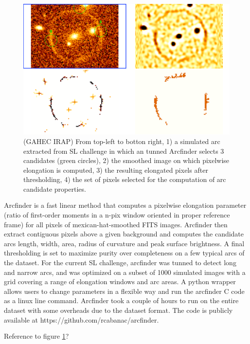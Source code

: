 \documentclass[useAMS,usenatbib]{mn2e}
\newcommand{\red}[1]{{\color{red} #1}}
\begin{document}
\begin{figure}
 \includegraphics[width=\columnwidth]{Cabanac/arcmethod.pdf}
 \caption{ (GAHEC IRAP) From top-left to botton right, 1) a simulated arc extracted from SL challenge in which an tunned Arcfinder selects 3 candidates (green circles), 2) the smoothed image on which pixelwise elongation is computed, 3) the resulting elongated pixels after thresholding, 4) the set of pixels selected for the computation of arc candidate properties. }
 \label{fig:Cabanac}
\end{figure}

Arcfinder \citep{2006astro.ph..6757A,2007A&A...461..813C,2012ApJ...749...38M} is a fast linear method that computes a pixelwise elongation parameter (ratio of first-order moments in a n-pix window oriented in proper reference frame) for all pixels of mexican-hat-smoothed FITS images. Arcfinder then extract contiguous pixels above a given background and computes the candidate arcs length, width, area, radius of curvature and peak surface brightness. A final thresholding is set to maximize purity over completeness on a few typical arcs of the dataset.
For the current SL challenge, arcfinder was tunned to detect long and narrow arcs, and was optimized on a subset of 1000 simulated images with a grid covering a range of elongation windows and arc areas.  A python wrapper allows users to change parameters in a flexible way and run the arcfinder C code as a linux line command. Arcfinder took a couple of hours to run on the entire dataset with some overheads due to the dataset format. The code is publicly available at https://github.com/rcabanac/arcfinder.

\red{Reference to figure \ref{fig:Cabanac}?}
\end{document}
